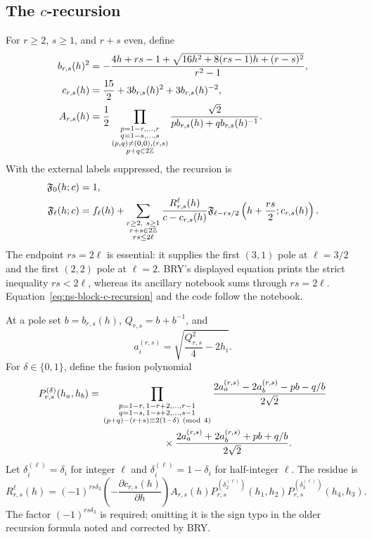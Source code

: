 \documentclass[11pt]{article}
\begin{document}
\subsection{The \texorpdfstring{$c$}{c}-recursion}

For $r\geq2$, $s\geq1$, and $r+s$ even, define
\begin{align}
 b_{r,s}(h)^2
 &=-\frac{4h+rs-1+
 \sqrt{16h^2+8(rs-1)h+(r-s)^2}}{r^2-1},\notag\\
 c_{r,s}(h)&=\frac{15}{2}+3b_{r,s}(h)^2+3b_{r,s}(h)^{-2},\notag\\
 A_{r,s}(h)&=\frac12
 \prod_{\substack{p=1-r,\ldots,r\\q=1-s,\ldots,s\\
 (p,q)\ne(0,0),(r,s)\\p+q\in2\mathbb Z}}
 \frac{\sqrt2}{p b_{r,s}(h)+q b_{r,s}(h)^{-1}}.
 \label{eq:ns-block-pole-data}
\end{align}
With the external labels suppressed, the recursion is
\begin{align}
 \mathfrak F_0(h;c)&=1,\notag\\
 \mathfrak F_\ell(h;c)
 &=f_\ell(h)+
 \sum_{\substack{r\geq2,\ s\geq1\\r+s\in2\mathbb Z\\rs\leq2\ell}}
 \frac{R^{\ell}_{r,s}(h)}{c-c_{r,s}(h)}
 \mathfrak F_{\ell-rs/2}
 \left(h+\frac{rs}{2};c_{r,s}(h)\right).
 \label{eq:ns-block-c-recursion}
\end{align}
The endpoint $rs=2\ell$ is essential: it supplies the first $(3,1)$ pole
at $\ell=3/2$ and the first $(2,2)$ pole at $\ell=2$.  BRY's displayed
equation prints the strict inequality $rs<2\ell$, whereas its ancillary
notebook sums through $rs=2\ell$.  Equation~\eqref{eq:ns-block-c-recursion}
and the code follow the notebook.

At a pole set $b=b_{r,s}(h)$, $Q_{r,s}=b+b^{-1}$, and
\begin{equation}
 a_i^{(r,s)}=\sqrt{\frac{Q_{r,s}^2}{4}-2h_i}.
 \label{eq:ns-block-pole-momenta}
\end{equation}
For $\delta\in\{0,1\}$, define the fusion polynomial
\begin{align}
 P_{r,s}^{(\delta)}(h_a,h_b)
 ={}&\prod_{\substack{p=1-r,\,1-r+2,\ldots,r-1\\
 q=1-s,\,1-s+2,\ldots,s-1\\
 (p+q)-(r+s)\equiv2(1-\delta)\ ({\rm mod}\ 4)}}
 \frac{2a_a^{(r,s)}-2a_b^{(r,s)}-pb-q/b}{2\sqrt2}\notag\\
 &\hspace{2.2cm}\times
 \frac{2a_a^{(r,s)}+2a_b^{(r,s)}+pb+q/b}{2\sqrt2}.
 \label{eq:ns-block-fusion-polynomial}
\end{align}
Let $\delta_i^{(\ell)}=\delta_i$ for integer $\ell$ and
$\delta_i^{(\ell)}=1-\delta_i$ for half-integer $\ell$.  The residue is
\begin{equation}
 R^{\ell}_{r,s}(h)=
 (-1)^{rs\delta_3}
 \left(-\frac{\partial c_{r,s}(h)}{\partial h}\right)A_{r,s}(h)
 P_{r,s}^{(\delta_2^{(\ell)})}(h_1,h_2)
 P_{r,s}^{(\delta_3^{(\ell)})}(h_4,h_3).
 \label{eq:ns-block-residue}
\end{equation}
The factor $(-1)^{rs\delta_3}$ is required; omitting it is the sign typo in
the older recursion formula noted and corrected by BRY.
\end{document}

